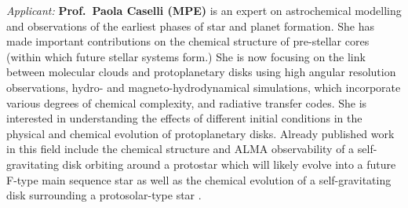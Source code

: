 \documentclass[10pt,fleqn,twoside,a4paper]{article}
\begin{document}
{\it Applicant:} {\bf Prof.\ Paola Caselli (MPE)} 
is an expert on astrochemical
modelling and observations of the earliest phases of star and planet
formation. She has made important contributions on the chemical structure
of pre-stellar cores (within which future stellar systems form.)
She is
now focusing on the link between molecular clouds and protoplanetary
disks using high angular resolution observations, hydro- and
magneto-hydrodynamical simulations, which incorporate various degrees
of chemical complexity, and radiative transfer codes. She is
interested in understanding the effects of different initial
conditions in the physical and chemical evolution of protoplanetary
disks. Already published work in this field include the chemical
structure and ALMA observability of a self-gravitating disk orbiting
around a protostar which will likely evolve into a future F-type main
sequence star \citep{2011MNRAS.417.2950I, 2013MNRAS.433.2064D}
as well as the
chemical evolution of a self-gravitating disk surrounding a
protosolar-type star \citep{2015MNRAS.453.1147E}. 
\end{document}

